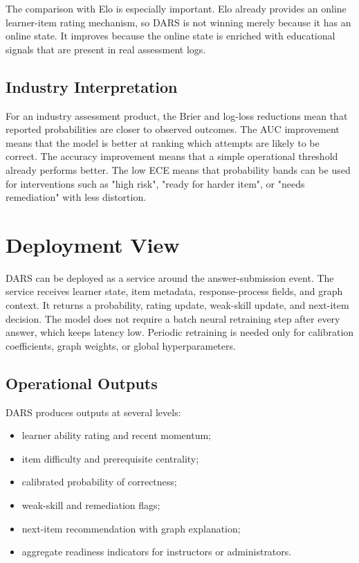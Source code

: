 \documentclass[conference]{IEEEtran}
\begin{document}
The comparison with Elo is especially important. Elo already provides an online learner-item rating mechanism, so DARS is not winning merely because it has an online state. It improves because the online state is enriched with educational signals that are present in real assessment logs.

\subsection{Industry Interpretation}
For an industry assessment product, the Brier and log-loss reductions mean that reported probabilities are closer to observed outcomes. The AUC improvement means that the model is better at ranking which attempts are likely to be correct. The accuracy improvement means that a simple operational threshold already performs better. The low ECE means that probability bands can be used for interventions such as "high risk", "ready for harder item", or "needs remediation" with less distortion.

\section{Deployment View}
DARS can be deployed as a service around the answer-submission event. The service receives learner state, item metadata, response-process fields, and graph context. It returns a probability, rating update, weak-skill update, and next-item decision. The model does not require a batch neural retraining step after every answer, which keeps latency low. Periodic retraining is needed only for calibration coefficients, graph weights, or global hyperparameters.

\subsection{Operational Outputs}
DARS produces outputs at several levels:
\begin{itemize}
    \item learner ability rating and recent momentum;
    \item item difficulty and prerequisite centrality;
    \item calibrated probability of correctness;
    \item weak-skill and remediation flags;
    \item next-item recommendation with graph explanation;
    \item aggregate readiness indicators for instructors or administrators.
\end{itemize}
\end{document}
